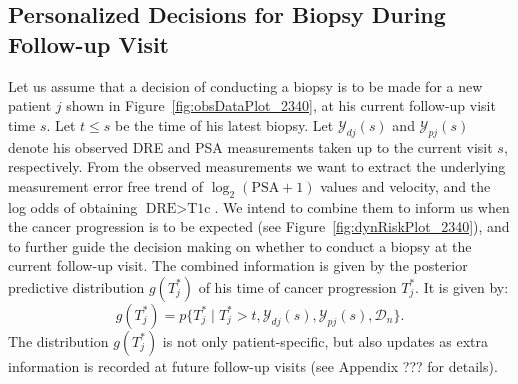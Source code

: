 \subsection{Personalized Decisions for Biopsy During Follow-up Visit}
\label{subsec:pers_decision_making}
Let us assume that a decision of conducting a biopsy is to be made for a new patient $j$ shown in Figure~\ref{fig:obsDataPlot_2340}, at his current follow-up visit time $s$. Let $t\leq s$ be the time of his latest biopsy. Let $\mathcal{Y}_{dj}(s)$ and $\mathcal{Y}_{pj}(s)$ denote his observed DRE and PSA measurements taken up to the current visit $s$, respectively. From the observed measurements we want to extract the underlying measurement error free trend of $\log_2 (\mbox{PSA} + 1)$ values and velocity, and the log odds of obtaining $\mbox{DRE} > \mbox{T1c}$. We intend to combine them to inform us when the cancer progression is to be expected (see Figure~\ref{fig:dynRiskPlot_2340}), and to further guide the decision making on whether to conduct a biopsy at the current follow-up visit. The combined information is given by the posterior predictive distribution $g(T^*_j)$ of his time of cancer progression $T^*_j$. It is given by:
\begin{equation*}
\label{eq:post_pred_dist}
g(T^*_j) = p\big\{T^*_j \mid T^*_j > t, \mathcal{Y}_{dj}(s), \mathcal{Y}_{pj}(s), \mathcal{D}_n\big\}.
\end{equation*}
The distribution $g(T^*_j)$ is not only patient-specific, but also updates as extra information is recorded at future follow-up visits (see Appendix ??? for details).

